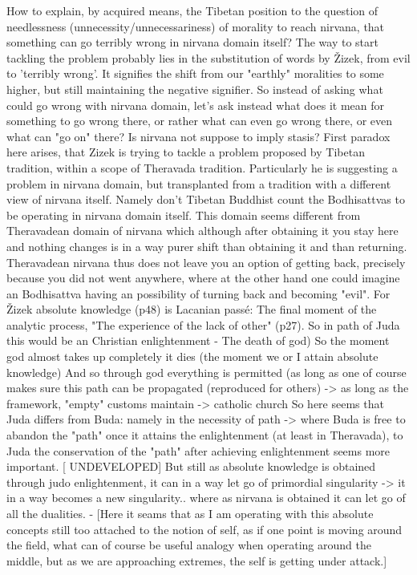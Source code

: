 \documentclass[10pt]{book}
\begin{document}
How to explain, by acquired means, the Tibetan position to the question of needlessness (unnecessity/unnecessariness) of morality to reach nirvana, that something can go terribly wrong in nirvana domain itself?
The way to start tackling the problem probably lies in the substitution of words by \v Zizek, from evil to 'terribly wrong'. It signifies the shift from our "earthly" moralities to some higher, but still maintaining the negative signifier. So instead of asking what could go wrong with nirvana domain, let's ask instead what does it mean for something to go wrong there, or rather what can even go wrong there, or even what can "go on" there? Is nirvana not suppose to imply stasis?
First paradox here arises, that Zizek is trying to tackle a problem proposed by Tibetan tradition, within a scope of Theravada tradition. Particularly he is suggesting a problem in nirvana domain, but transplanted from a tradition with a different view of nirvana itself. Namely don't Tibetan Buddhist count the Bodhisattvas to be operating in nirvana domain itself. This domain seems different from Theravadean domain of nirvana which although after obtaining it you stay here and nothing changes is in a way purer shift than obtaining it and than returning. Theravadean nirvana thus does not leave you an option of getting back, precisely because you did not went anywhere, where at the other hand one could imagine an Bodhisattva having an possibility of turning back and becoming "evil".
For \v Zizek absolute knowledge (p48) is Lacanian pass\'e: 
The final moment of the analytic process, "The experience of the lack of other" (p27). So in path of Juda this would be an Christian enlightenment - The death of god) So the moment god almost takes up completely it dies (the moment we or I attain absolute knowledge) And so through god everything is permitted (as long as one of course makes sure this path can be propagated (reproduced for others) -> as long as the framework, "empty" customs maintain -> catholic church 
So here seems that Juda differs from Buda: namely in the necessity of path -> where Buda is free to abandon the "path" once it attains the enlightenment (at least in Theravada), to Juda the conservation of the "path" after achieving enlightenment seems more important. [ UNDEVELOPED] But still as absolute knowledge is obtained through judo enlightenment, it can in a way let go of primordial singularity -> it in a way becomes a new singularity.. where as nirvana is obtained it can let go of all the dualities. - [Here it seams that as I am operating with this absolute concepts still too attached to the notion of self, as if one point is moving around the field, what can of course be useful analogy when operating around the middle, but as we are approaching extremes, the self is getting under attack.]
\end{document}
